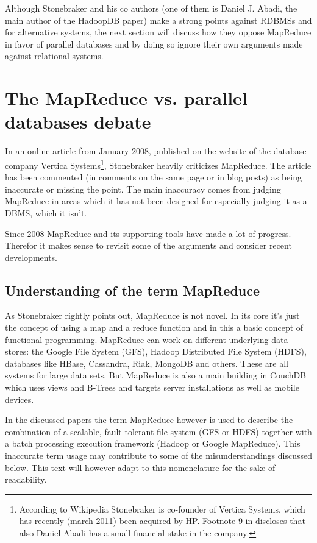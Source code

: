 \documentclass[12pt,a4paper]{scrartcl}		%
\begin{document}
Although Stonebraker and his co authors (one of them is Daniel J. Abadi, the main author of the HadoopDB paper) make a strong points against RDBMSs and for alternative systems, the next section will discuss how they oppose MapReduce in favor of parallel databases and by doing so ignore their own arguments made against relational systems.

\section{The MapReduce vs. parallel databases debate}
In an online article from January 2008, published on the website of the database company Vertica Systems\footnote
{According to Wikipedia Stonebraker is co-founder of Vertica Systems, which has recently (march 2011) been acquired by HP. Footnote 9 in \cite{journals/pvldb/AbouzeidBARS09} discloses that also Daniel Abadi has a small financial stake in the company.},
Stonebraker heavily criticizes MapReduce.\cite{sto08stepback} The article has been commented (in comments on the same page or in blog posts\cite{Chu-Carrol08hammers}) as being inaccurate or missing the point. The main inaccuracy comes from judging MapReduce in areas which it has not been designed for especially judging it as a DBMS, which it isn't.

Since 2008 MapReduce and its supporting tools have made a lot of progress. Therefor it makes sense to revisit some of the arguments and consider recent developments.

\subsection{Understanding of the term MapReduce}
As Stonebraker rightly points out, MapReduce is not novel. In its core it's just the concept of using a map and a reduce function and in this a basic concept of functional programming. MapReduce can work on different underlying data stores: the Google File System (GFS), Hadoop Distributed File System (HDFS), databases like HBase, Cassandra, Riak, MongoDB and others. These are all systems for large data sets. But MapReduce is also a main building in CouchDB which uses views and B-Trees and targets server installations as well as mobile devices.

In the discussed papers the term MapReduce however is used to describe the combination of a scalable, fault tolerant file system (GFS or HDFS) together with a batch processing execution framework (Hadoop or Google MapReduce).
This inaccurate term usage may contribute to some of the misunderstandings discussed below. This text will however adapt to this nomenclature for the sake of readability.
\end{document}
